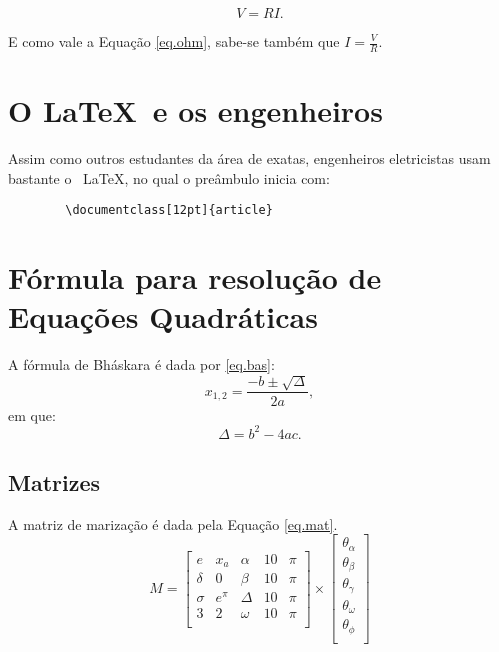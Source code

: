 \documentclass[12pt, twocolumn]{article}
\begin{document}
    \begin{equation}
        \label{eq.ohm}
        V = RI.
    \end{equation}
    
    E como vale a Equação \ref{eq.ohm}, sabe-se também que $I = \frac{V}{R}$.
    
    \section{O \LaTeX \ e os engenheiros}
    
    Assim como outros estudantes da área de exatas, engenheiros eletricistas usam bastante o \ \LaTeX, no qual o preâmbulo inicia com:
    \begin{verbatim}
        \documentclass[12pt]{article}
    \end{verbatim}
    
    
    \section{Fórmula para resolução de Equações Quadráticas}
    
    A fórmula de Bháskara é dada por \ref{eq.bas}:
    \begin{equation}
        \label{eq.bas}
        x_{1,2} = \frac{-b \pm \sqrt{\Delta}}{2a},
    \end{equation}
    em que:
    $$
        \Delta = b^2-4ac.
    $$
    
    \subsection{Matrizes}
    
    A matriz de marização é dada pela Equação \ref{eq.mat}.
    \begin{equation}
        \label{eq.mat}
        M = \left[ 
            \begin{array}{ccccc}
            e        &    x_a    &    \alpha &   10  &  \pi\\
            \delta   &    0      &    \beta  &   10  &  \pi \\
            \sigma   &    e^\pi  &    \Delta &   10   & \pi  \\
            3        &    2      &    \omega &   10   & \pi  \\
            \end{array}
        \right]
        \times
        \left[ 
            \begin{array}{c}
            \theta_{\alpha}  \\
            \theta_{\beta}   \\
            \theta_{\gamma}   \\
            \theta_{\omega}   \\
            \theta_{\phi}   \\
            \end{array}
        \right]
    \end{equation}
    
\end{document}
